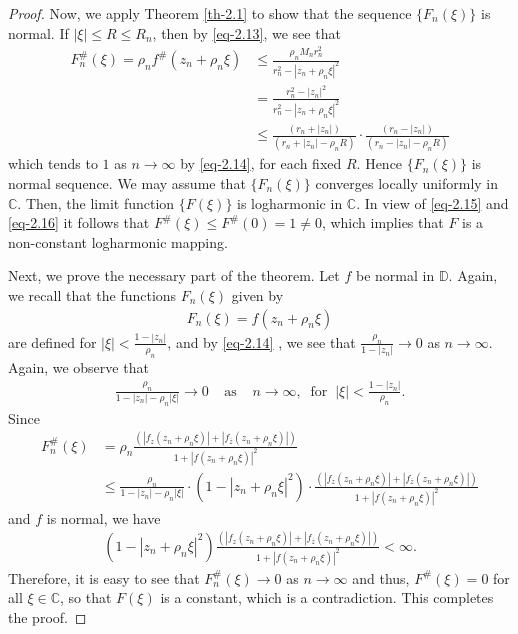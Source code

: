 \documentclass[a4paper,12pt]{amsart}
\theoremstyle{plain}
\theoremstyle{definition}
\begin{document}
\begin{proof}
Now, we apply Theorem \ref{th-2.1} to show that the sequence $\{F_n(\xi)\}$ is normal. If $|\xi|\leq R\leq R_n$, then by \eqref{eq-2.13}, we see that
\begin{align}\label{eq-2.16}
	F^{\#}_n(\xi)=\rho_n f^{\#}(z_n+\rho_n\xi)&\leq \frac{\rho_n M_n r^2_n}{r^2_n -|z_n+\rho_n\xi|^2} \\&\nonumber=\frac{r^2_n -|z_n|^2}{r^2_n -|z_n+\rho_n\xi|^2} \\&\nonumber\leq \frac{(r_n +|z_n|)}{(r_n +|z_n|-\rho_n R)}\cdot\frac{(r_n -|z_n|)}{(r_n -|z_n|-\rho_n R)}
\end{align} 
which tends to $1$ as $n\rightarrow\infty$ by \eqref{eq-2.14}, for each fixed $R$. Hence $\{F_n(\xi)\}$ is normal sequence. We may assume that $\{F_n(\xi)\}$ converges locally uniformly in $\mathbb{C}$. Then, the limit function $\{F(\xi)\}$ is logharmonic in $\mathbb{C}$. In view of \eqref{eq-2.15} and \eqref{eq-2.16} it follows that $F^{\#}(\xi)\leq F^{\#}(0)= 1\neq 0$, which implies that $F$ is a non-constant logharmonic mapping. \vspace{2mm}

Next, we prove the necessary part of the theorem. Let $f$ be normal in $\mathbb{D}$. Again, we recall that the functions $F_n(\xi)$ given by
\begin{align*}
	F_n(\xi)=f(z_n+\rho_n\xi)
\end{align*}
are defined for $|\xi|<\frac{1-|z_n|}{\rho_n}$, and by \eqref{eq-2.14} , we see that $\frac{\rho_n}{1-|z_n|}\rightarrow 0$ as $n\rightarrow \infty$. Again, we observe that
\begin{align*}
	\frac{\rho_n}{1-|z_n|-\rho_n |\xi|}\rightarrow 0 \;\;\;\;\mbox{as} \;\;\;\;n\rightarrow \infty,\;\;\mbox{for}\;\; |\xi|<\frac{1-|z_n|}{\rho_n}.
\end{align*}
Since
\begin{align*}
	F^{\#}_n(\xi)&=\rho_n \frac{\left(|f_z(z_n+\rho_n\xi)| + |f_{\overline{z}}(z_n+\rho_n\xi)|\right)}{1+ |f(z_n+\rho_n\xi)|^2} \\&\leq \frac{\rho_n} {1-|z_n|-\rho_n |\xi|}\cdot \left(1 -|z_n+\rho_n\xi|^2\right) \cdot\frac{\left(|f_z(z_n+\rho_n\xi)| + |f_{\overline{z}}(z_n+\rho_n\xi)|\right)}{1+ |f(z_n+\rho_n\xi)|^2}
\end{align*}
and $f$ is normal, we have
\begin{align*}
	\left(1 -|z_n+\rho_n\xi|^2\right) \frac{\left(|f_z(z_n+\rho_n\xi)| + |f_{\overline{z}}(z_n+\rho_n\xi)|\right)}{1+ |f(z_n+ \rho_n\xi)|^2}<\infty.
\end{align*}
Therefore, it is easy to see that $F^{\#}_n(\xi)\rightarrow 0$ as $n\rightarrow\infty$ and thus, $F^{\#}(\xi)=0$ for all $\xi\in \mathbb{C}$, so that $F(\xi)$ is a constant, which is a contradiction. This completes the proof. 
\end{proof}
\end{document}
